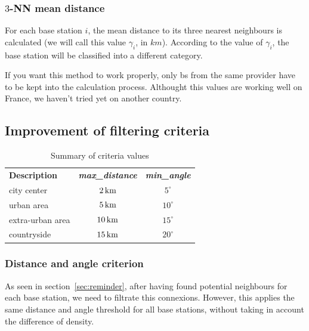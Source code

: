 \documentclass[lettersize,journal,english]{IEEEtran}
\begin{document}
\subsubsection{$3$-NN mean distance}
For each base station $i$, the mean distance to its three nearest neighbours is calculated (we will call this value $\gamma_i$, in 
$\unit{km}$). According to the value of $\gamma_i$, the base station will be classified into a different category.

If you want this method to work properly, only \acrshort{bs} from the same provider have to be kept into the calculation process.
Althought this values are working well on France, we haven't tried yet on another country.


\subsection{Improvement of filtering criteria}
\begin{table}
    \centering
    \caption{Summary of criteria values}
    \label{table:crit_summary}
    \begin{tabular}{lcc}
        \toprule
        \textbf{Description} & \textbf{\emph{max\_distance}} & \textbf{\emph{min\_angle}} \\
        \cmidrule(lr){1-3}
        city center & $\unit[2]{km}$ & $5^\circ$ \\
        urban area & $\unit[5]{km}$ & $10^\circ$ \\
        extra-urban area & $\unit[10]{km}$ & $15^\circ$ \\
        countryside & $\unit[15]{km}$ & $20^\circ$ \\
        \bottomrule
    \end{tabular}
\end{table}

\subsubsection{Distance and angle criterion}
As seen in section~\ref{sec:reminder}, after having found potential neighbours for each base station,
we need to filtrate this connexions. However, this applies the same distance and angle threshold for all base stations, without taking in account the difference of density.
\end{document}
